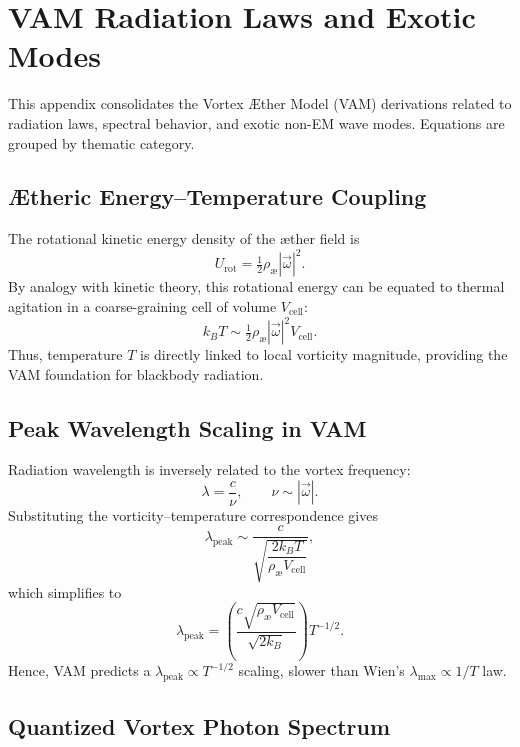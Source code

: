 \documentclass[11pt]{article}
\begin{document}
    \appendix
    \section{VAM Radiation Laws and Exotic Modes}
    \label{app:VAM-radiation}

    This appendix consolidates the Vortex \AE{}ther Model (VAM) derivations
    related to radiation laws, spectral behavior, and exotic non-EM wave modes.
    Equations are grouped by thematic category.

    \subsection{Ætheric Energy–Temperature Coupling}

    The rotational kinetic energy density of the æther field is
    \[
        U_{\text{rot}} = \tfrac{1}{2} \rho_\text{\ae} |\vec{\omega}|^2.
    \]
    By analogy with kinetic theory, this rotational energy can be equated to
    thermal agitation in a coarse-graining cell of volume $V_{\text{cell}}$:
    \[
        k_B T \sim \tfrac{1}{2} \rho_\text{\ae} |\vec{\omega}|^2 V_{\text{cell}}.
    \]
    Thus, temperature $T$ is directly linked to local vorticity magnitude,
    providing the VAM foundation for blackbody radiation.

    \subsection{Peak Wavelength Scaling in VAM}

    Radiation wavelength is inversely related to the vortex frequency:
    \[
        \lambda = \frac{c}{\nu}, \qquad \nu \sim |\vec{\omega}|.
    \]
    Substituting the vorticity–temperature correspondence gives
    \[
        \lambda_{\text{peak}} \sim
        \frac{c}{\sqrt{ \dfrac{2 k_B T}{\rho_\text{\ae} V_{\text{cell}}} }},
    \]
    which simplifies to
    \[
        \lambda_{\text{peak}} =
        \left( \frac{c \sqrt{\rho_\text{\ae} V_{\text{cell}}}}{\sqrt{2 k_B}} \right) T^{-1/2}.
    \]
    Hence, VAM predicts a $\lambda_{\text{peak}} \propto T^{-1/2}$ scaling,
    slower than Wien’s $\lambda_{\text{max}} \propto 1/T$ law.

    \subsection{Quantized Vortex Photon Spectrum}
\end{document}
